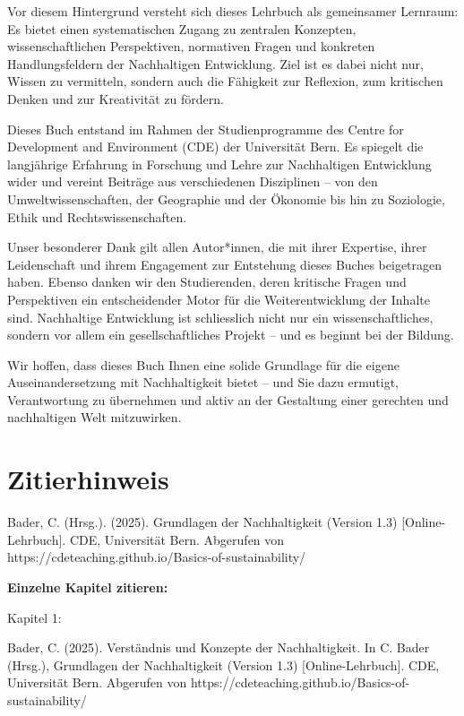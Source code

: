 \documentclass[
  nswissgerman,
  a4paper,
  DIV=11,
  numbers=noendperiod,
  oneside,
  openany]{scrreprt}
\begin{document}
Vor diesem Hintergrund versteht sich dieses Lehrbuch als gemeinsamer
Lernraum: Es bietet einen systematischen Zugang zu zentralen Konzepten,
wissenschaftlichen Perspektiven, normativen Fragen und konkreten
Handlungsfeldern der Nachhaltigen Entwicklung. Ziel ist es dabei nicht
nur, Wissen zu vermitteln, sondern auch die Fähigkeit zur Reflexion, zum
kritischen Denken und zur Kreativität zu fördern.

Dieses Buch entstand im Rahmen der Studienprogramme des Centre for
Development and Environment (CDE) der Universität Bern. Es spiegelt die
langjährige Erfahrung in Forschung und Lehre zur Nachhaltigen
Entwicklung wider und vereint Beiträge aus verschiedenen Disziplinen --
von den Umweltwissenschaften, der Geographie und der Ökonomie bis hin zu
Soziologie, Ethik und Rechtswissenschaften.

Unser besonderer Dank gilt allen Autor*innen, die mit ihrer Expertise,
ihrer Leidenschaft und ihrem Engagement zur Entstehung dieses Buches
beigetragen haben. Ebenso danken wir den Studierenden, deren kritische
Fragen und Perspektiven ein entscheidender Motor für die
Weiterentwicklung der Inhalte sind. Nachhaltige Entwicklung ist
schliesslich nicht nur ein wissenschaftliches, sondern vor allem ein
gesellschaftliches Projekt -- und es beginnt bei der Bildung.

Wir hoffen, dass dieses Buch Ihnen eine solide Grundlage für die eigene
Auseinandersetzung mit Nachhaltigkeit bietet -- und Sie dazu ermutigt,
Verantwortung zu übernehmen und aktiv an der Gestaltung einer gerechten
und nachhaltigen Welt mitzuwirken.

\section*{Zitierhinweis}\label{zitierhinweis}


Bader, C. (Hrsg.). (2025). Grundlagen der Nachhaltigkeit (Version 1.3)
{[}Online-Lehrbuch{]}. CDE, Universität Bern. Abgerufen von
https://cdeteaching.github.io/Basics-of-sustainability/

\textbf{Einzelne Kapitel zitieren:}

Kapitel 1:

Bader, C. (2025). Verständnis und Konzepte der Nachhaltigkeit. In C.
Bader (Hrsg.), Grundlagen der Nachhaltigkeit (Version 1.3)
{[}Online-Lehrbuch{]}. CDE, Universität Bern. Abgerufen von
https://cdeteaching.github.io/Basics-of-sustainability/
\end{document}
